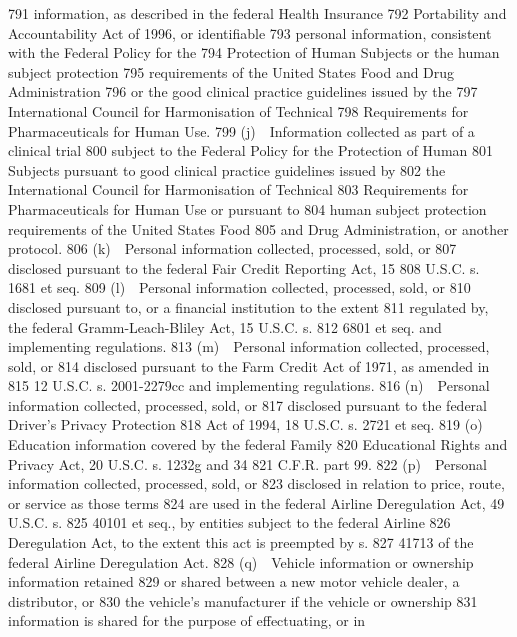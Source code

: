   791  information, as described in the federal Health Insurance
  792  Portability and Accountability Act of 1996, or identifiable
  793  personal information, consistent with the Federal Policy for the
  794  Protection of Human Subjects or the human subject protection
  795  requirements of the United States Food and Drug Administration
  796  or the good clinical practice guidelines issued by the
  797  International Council for Harmonisation of Technical
  798  Requirements for Pharmaceuticals for Human Use.
  799         (j) Information collected as part of a clinical trial
  800  subject to the Federal Policy for the Protection of Human
  801  Subjects pursuant to good clinical practice guidelines issued by
  802  the International Council for Harmonisation of Technical
  803  Requirements for Pharmaceuticals for Human Use or pursuant to
  804  human subject protection requirements of the United States Food
  805  and Drug Administration, or another protocol.
  806         (k) Personal information collected, processed, sold, or
  807  disclosed pursuant to the federal Fair Credit Reporting Act, 15
  808  U.S.C. s. 1681 et seq.
  809         (l) Personal information collected, processed, sold, or
  810  disclosed pursuant to, or a financial institution to the extent
  811  regulated by, the federal Gramm-Leach-Bliley Act, 15 U.S.C. s.
  812  6801 et seq. and implementing regulations.
  813         (m) Personal information collected, processed, sold, or
  814  disclosed pursuant to the Farm Credit Act of 1971, as amended in
  815  12 U.S.C. s. 2001-2279cc and implementing regulations.
  816         (n) Personal information collected, processed, sold, or
  817  disclosed pursuant to the federal Driver’s Privacy Protection
  818  Act of 1994, 18 U.S.C. s. 2721 et seq.
  819         (o) Education information covered by the federal Family
  820  Educational Rights and Privacy Act, 20 U.S.C. s. 1232g and 34
  821  C.F.R. part 99.
  822         (p) Personal information collected, processed, sold, or
  823  disclosed in relation to price, route, or service as those terms
  824  are used in the federal Airline Deregulation Act, 49 U.S.C. s.
  825  40101 et seq., by entities subject to the federal Airline
  826  Deregulation Act, to the extent this act is preempted by s.
  827  41713 of the federal Airline Deregulation Act.
  828         (q) Vehicle information or ownership information retained
  829  or shared between a new motor vehicle dealer, a distributor, or
  830  the vehicle’s manufacturer if the vehicle or ownership
  831  information is shared for the purpose of effectuating, or in
